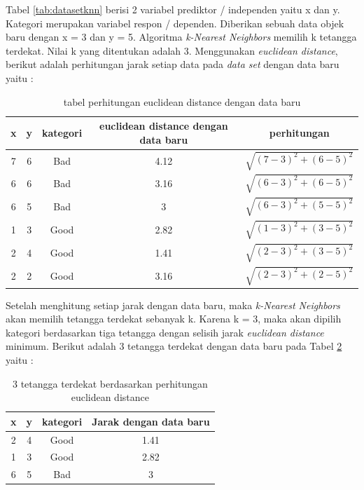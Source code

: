 \documentclass[a4paper,twoside]{article}
\begin{document}
\begin{enumerate}
 Tabel \ref{tab:datasetknn} berisi 2 variabel prediktor / independen yaitu x dan y. Kategori merupakan variabel respon / dependen. Diberikan sebuah data objek baru dengan x = 3 dan y = 5. Algoritma \textit{k-Nearest Neighbors}  memilih k tetangga terdekat.  Nilai k yang ditentukan adalah 3. Menggunakan \textit{euclidean distance}, berikut adalah perhitungan jarak setiap data pada \textit{data set}  dengan data baru yaitu : 
 
 \begin{table}[ht]
 \centering
\begin{tabular}{|c|c|c|c|c|}
 \hline 
 x & y & kategori & euclidean distance dengan data baru & perhitungan \\ 
 \hline 
 7 & 6 & Bad & 4.12 & $\sqrt{(7-3)^2+(6-5)^2}$ \\ 
 \hline 
 6 & 6 & Bad & 3.16 & $\sqrt{(6-3)^2+(6-5)^2}$ \\ 
 \hline 
 6 & 5 & Bad & 3 & $\sqrt{(6-3)^2+(5-5)^2}$ \\ 
 \hline 
 1 & 3 & Good & 2.82 & $\sqrt{(1-3)^2+(3-5)^2}$ \\ 
 \hline 
 2 & 4 & Good & 1.41 & $\sqrt{(2-3)^2+(3-5)^2}$ \\ 
 \hline 
 2 & 2 & Good & 3.16 & $\sqrt{(2-3)^2+(2-5)^2}$ \\ 
 \hline 
 \end{tabular}  
 \caption{tabel perhitungan euclidean distance dengan data baru}
 \label{tab:hitunganeuclideandistanceknn}
  \end{table}
  
Setelah menghitung setiap jarak dengan data baru, maka \textit{k-Nearest Neighbors} akan memilih tetangga terdekat sebanyak k. Karena k = 3, maka akan dipilih kategori berdasarkan tiga tetangga dengan selisih jarak \textit{euclidean distance} minimum. Berikut adalah 3 tetangga terdekat dengan data baru pada Tabel \ref{tab:tabel3tetangga} yaitu : 

\begin{table}[ht]
\centering
\begin{tabular}{|c|c|c|c|}
\hline 
x & y & kategori & Jarak dengan data baru \\ 
\hline 
2 & 4 & Good & 1.41 \\ 
\hline 
1 & 3 & Good & 2.82 \\ 
\hline 
6 & 5 & Bad & 3 \\ 
\hline 
\end{tabular} 
\caption{3 tetangga terdekat berdasarkan perhitungan euclidean distance}
\label{tab:tabel3tetangga}
 \end{table}


\end{enumerate}
\end{document}
